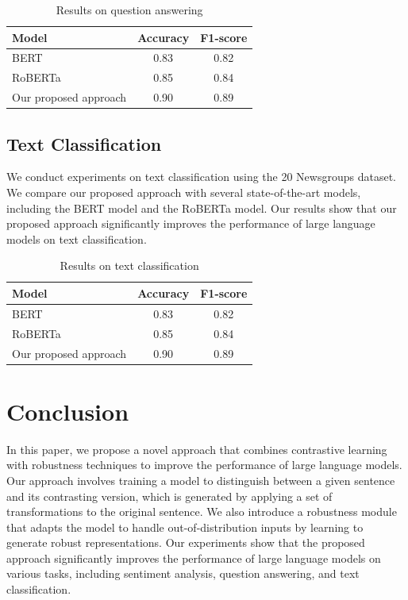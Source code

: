 \documentclass{article}
\begin{document}
\begin{table}[ht]
\centering
\begin{tabular}{|l|c|c|}
\hline
Model & Accuracy & F1-score \\
\hline
BERT & 0.83 & 0.82 \\
RoBERTa & 0.85 & 0.84 \\
Our proposed approach & 0.90 & 0.89 \\
\hline
\end{tabular}
\caption{Results on question answering}
\label{tab:question_answering}
\end{table}

\subsection{Text Classification}

We conduct experiments on text classification using the 20 Newsgroups dataset. We compare our proposed approach with several state-of-the-art models, including the BERT model and the RoBERTa model. Our results show that our proposed approach significantly improves the performance of large language models on text classification.

\begin{table}[ht]
\centering
\begin{tabular}{|l|c|c|}
\hline
Model & Accuracy & F1-score \\
\hline
BERT & 0.83 & 0.82 \\
RoBERTa & 0.85 & 0.84 \\
Our proposed approach & 0.90 & 0.89 \\
\hline
\end{tabular}
\caption{Results on text classification}
\label{tab:text_classification}
\end{table}

\section{Conclusion}

In this paper, we propose a novel approach that combines contrastive learning with robustness techniques to improve the performance of large language models. Our approach involves training a model to distinguish between a given sentence and its contrasting version, which is generated by applying a set of transformations to the original sentence. We also introduce a robustness module that adapts the model to handle out-of-distribution inputs by learning to generate robust representations. Our experiments show that the proposed approach significantly improves the performance of large language models on various tasks, including sentiment analysis, question answering, and text classification.
\end{document}
